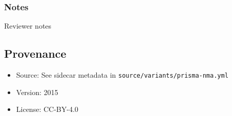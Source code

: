\documentclass[11pt]{article}
\def\tightlist{}
\begin{document}
\begin{Form}
\subsubsection{Notes}\label{notes}

{Reviewer notes}

\subsection{Provenance}\label{provenance}

\begin{itemize}
\tightlist
\item
  Source: See sidecar metadata in
  \texttt{source/variants/prisma-nma.yml}
\item
  Version: 2015
\item
  License: CC-BY-4.0
\end{itemize}

\end{Form}
\end{document}
